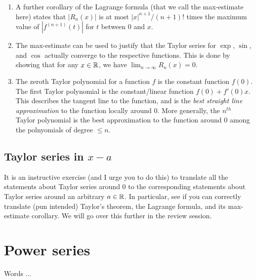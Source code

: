 \documentclass[10pt]{amsart}
\begin{document}
\begin{enumerate}
\item A further corollary of the Lagrange formula (that we call the
  max-estimate here) states that $|R_n(x)|$ is at most $|x|^{n+1}/(n +
  1)!$ times the maximum value of $|f^{(n + 1)}(t)|$ for $t$ between
  $0$ and $x$.
\item The max-estimate can be used to justify that the Taylor series
  for $\exp$, $\sin$, and $\cos$ actually converge to the respective
  functions. This is done by showing that for any $x \in \mathbb{R}$, we have
  $\lim_{n \to \infty} R_n(x) = 0$.
\item The zeroth Taylor polynomial for a function $f$ is the constant
  function $f(0)$. The first Taylor polynomial is the constant/linear
  function $f(0) + f'(0)x$. This describes the tangent line to the
  function, and is the {\em best straight line approximation} to the
  function locally around $0$. More generally, the $n^{th}$ Taylor
  polynomial is the best approximation to the function around $0$
  among the polnyomials of degree $\le n$.
\end{enumerate}

\subsection{Taylor series in $x - a$}

It is an instructive exercise (and I urge you to do this) to translate
all the statements about Taylor series around $0$ to the corresponding
statements about Taylor series around an arbitrary $a \in \mathbb{R}$. In
particular, see if you can correctly translate (pun intended) Taylor's
theorem, the Lagrange formula, and its max-estimate corollary. We will
go over this further in the review session.

\section{Power series}

Words ...
\end{document}

